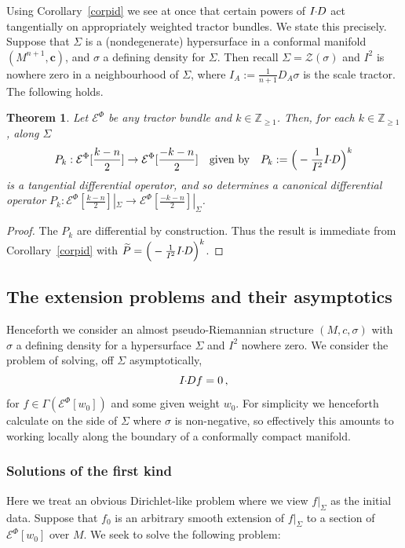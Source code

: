 \documentclass[a4paper,12pt]{amsart}
\def\Cal{\mathcal}
\newcommand{\cc}{\boldsymbol{c}}
\newcommand{\ce}{{\Cal E}}
\newcommand{\si}{\sigma}
\newtheorem{theorem}{Theorem}[section]
\theoremstyle{remark}
\begin{document}
Using Corollary~\ref{corpid} we see at once that certain powers of
$I\hspace*{-1mm} \cdot \hspace*{-1mm} D$ act tangentially on appropriately weighted tractor bundles.
We state this precisely. Suppose that $\Sigma$ is a (nondegenerate) hypersurface in a conformal manifold $(M^{n+1},\cc)$, and $\si$ a defining density for $\Sigma$. Then recall $\Sigma =\mathcal{Z}(\si)$ and $I^2$ is nowhere zero in a neighbourhood of $\Sigma$, where $I_A:=\frac{1}{n+1}D_A\si$
is the scale tractor.  The following holds.
\begin{theorem}\label{tanth}
  Let $\ce^\Phi$ be any tractor bundle and $k\in \mathbb{Z}_{\geq 1}$.
  Then, for each $k\in \mathbb{Z}_{\geq 1}$, along $\Sigma$
\begin{equation}\label{tan}
P_k: \ce^\Phi[\frac{k-n}{2}]\to \ce^\Phi[\frac{-k-n}{2}]
\quad \mbox{given by}\quad 
P_k:= \Big(-\frac{1}{I^2} \ID\Big)^k
\end{equation}
is a tangential differential operator, and so determines a canonical
differential operator $P_k: \ce^\Phi[\frac{k-n}{2}]|_\Sigma \to
\ce^\Phi[\frac{-k-n}{2}]|_\Sigma$.
\end{theorem}
\begin{proof}
  The $P_k$ are differential by construction. Thus the result is
  immediate from Corollary~\ref{corpid} with $\widetilde P =
  \Big(-\frac{1}{I^2} I\hspace*{-1mm} \cdot \hspace*{-1mm} D\Big)^k$.
\end{proof}



\subsection{The extension problems and their asymptotics} \label{ext}


Henceforth we consider an almost pseudo-Riemannian structure $(M,c,\si)$ with $\si$ a defining density for a hypersurface $\Sigma$ and $I^2$ nowhere zero.  We consider the problem of solving, off  $\Sigma$ asymptotically,
$$
I\hspace*{-1mm} \cdot \hspace*{-1mm} D
f=0\, ,
$$ 
for $f\in \Gamma (\ce^\Phi[w_0])$ and some given weight $w_0$. For
simplicity we henceforth calculate on the side of $\Sigma$ where $\si$ is
non-negative, so effectively this amounts to working locally along the boundary of a conformally compact manifold. 

\subsubsection{Solutions of the first kind}\label{first}
Here we treat an obvious Dirichlet-like problem where we view
$f|_\Sigma$ as the initial data.  Suppose that $f_0$ is an arbitrary
smooth extension of $f|_\Sigma$ to a section of $\ce^\Phi[w_0]$ over
$M$. We seek to solve the following problem:
\end{document}
